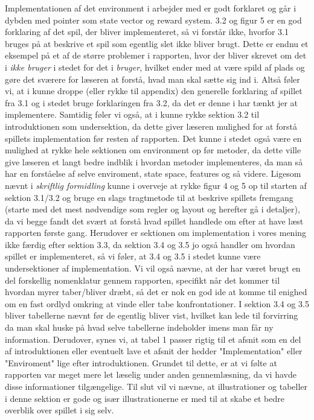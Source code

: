 \documentclass[11pt, fleqn, titlepage]{article}
\begin{document}
	Implementationen af det environment i arbejder med er godt forklaret og går i dybden med pointer som state vector og reward system. 3.2 og figur 5 er en god forklaring af det spil, der bliver implementeret, så vi forstår ikke, hvorfor 3.1 bruges på at beskrive et spil som egentlig slet ikke bliver brugt. Dette er endnu et eksempel på et af de større problemer i rapporten, hvor der bliver skrevet om det i \textit{ikke bruger} i stedet for det i \textit{bruger}, hvilket ender med at være spild af plads og gøre det sværere for læseren at forstå, hvad man skal sætte sig ind i. Altså føler vi, at i kunne droppe (eller rykke til appendix) den generelle forklaring af spillet fra 3.1 og i stedet bruge forklaringen fra 3.2, da det er denne i har tænkt jer at implementere. Samtidig føler vi også, at i kunne rykke sektion 3.2 til introduktionen som undersektion, da dette giver læseren mulighed for at forstå spillets implementation før resten af rapporten. Det kunne i stedet også være en mulighed at rykke hele sektionen om environment op før metoder, da dette ville give læseren et langt bedre indblik i hvordan metoder implementeres, da man så har en forståelse af selve enviroment, state space, features og så videre. Ligesom nævnt i \textit{skriftlig formidling} kunne i overveje at rykke figur 4 og 5 op til starten af sektion 3.1/3.2 og bruge en slags tragtmetode til at beskrive spillets fremgang (starte med det mest nødvendige som regler og layout og herefter gå i detaljer), da vi begge fandt det svært at forstå hvad spillet handlede om efter at have læst rapporten første gang. Herudover er sektionen om implementation i vores mening ikke færdig efter sektion 3.3, da sektion 3.4 og 3.5 jo også handler om hvordan spillet er implementeret, så vi føler, at 3.4 og 3.5 i stedet kunne være undersektioner af implementation. Vi vil også nævne, at der har været brugt en del forskellig nomenklatur gennem rapporten, specifikt når det kommer til hvordan myrer taber/bliver dræbt, så det er nok en god ide at komme til enighed om en fast ordlyd omkring at vinde eller tabe konfrontationer. I sektion 3.4 og 3.5 bliver tabellerne nævnt før de egentlig bliver vist, hvilket kan lede til forvirring da man skal huske på hvad selve tabellerne indeholder imens man får ny information. Derudover, synes vi, at tabel 1 passer rigtig til et afsnit som en del af introduktionen eller eventuelt lave et afsnit der hedder "Implementation" eller "Enviroment" lige efter introduktionen. Grundet til dette, er at vi følte at rapporten var meget mere let læselig under anden gennemlæsning, da vi havde disse informationer tilgængelige. Til slut vil vi nævne, at illustrationer og tabeller i denne sektion er gode og især illustrationerne er med til at skabe et bedre overblik over spillet i sig selv. 
	
\end{document}

